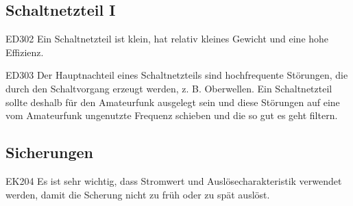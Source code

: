 \begin{ohmchapter}
\end{ohmchapter}


\subsection{Schaltnetzteil I}
\begin{sol}{ED302} 
  Ein Schaltnetzteil ist klein, hat relativ kleines Gewicht und eine hohe Effizienz.
\end{sol}

\begin{sol}{ED303} 
  Der Hauptnachteil eines Schaltnetzteils sind hochfrequente Störungen, die durch den Schaltvorgang erzeugt werden, z. B. Oberwellen.
  Ein Schaltnetzteil sollte deshalb für den Amateurfunk ausgelegt sein und diese Störungen auf eine vom Amateurfunk ungenutzte Frequenz schieben und die so gut es geht filtern.
\end{sol}


\begin{ohmchapter}
\end{ohmchapter}


\subsection{Sicherungen}

\begin{sol}{EK204} 
  Es ist sehr wichtig, dass Stromwert und Auslösecharakteristik verwendet werden, damit die Scherung nicht zu früh oder zu spät auslöst.
\end{sol}

\begin{ohmchapter}
\end{ohmchapter}

